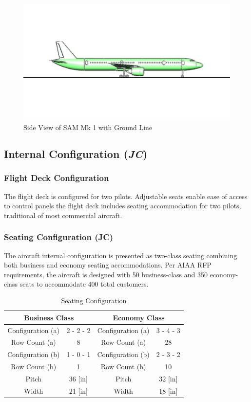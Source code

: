 \begin{figure}[!h]
    \centering
    \includegraphics[width=1.0\textwidth]{Photos/Ground_Line.pdf}
    \caption{Side View of SAM Mk 1 with Ground Line}
    \label{grndline}
 \end{figure}

\subsection{Internal Configuration (\textit{JC})}
\label{section: internal config}
\subsubsection{Flight Deck Configuration}
The flight deck is configured for two pilots.  Adjustable seats enable ease of access to control panels the flight deck includes seating accommodation for two pilots, traditional of most commercial aircraft.  

\subsubsection{Seating Configuration (JC)}
The aircraft internal configuration is presented as two-class seating combining both business and economy seating accommodations.  Per AIAA RFP \cite{RFP} requirements, the aircraft is designed with 50 business-class and 350 economy-class seats to accommodate 400 total customers.  

\begin{table}[!h]
    \centering
    \caption{Seating Configuration}
    \begin{tabular}{|c|c||c|c|} \toprule
        \multicolumn{2}{c}{\textbf{Business Class}} & \multicolumn{2}{c}{\textbf{Economy Class}} \\ \hline
        Configuration (a) & 2 - 2 - 2 & Configuration (a) & 3 - 4 - 3 \\ \hline
        Row Count (a) & 8 & Row Count (a) & 28 \\ \hline
        Configuration (b) & 1 - 0 - 1 & Configuration (b) & 2 - 3 - 2 \\ \hline
        Row Count (b) & 1 & Row Count (b) & 10 \\ \hline
        Pitch & 36 [in] & Pitch & 32 [in] \\ \hline
        Width & 21 [in] & Width & 18 [in] \\ \bottomrule
    \end{tabular}
    \label{tab:seating}
\end{table}

